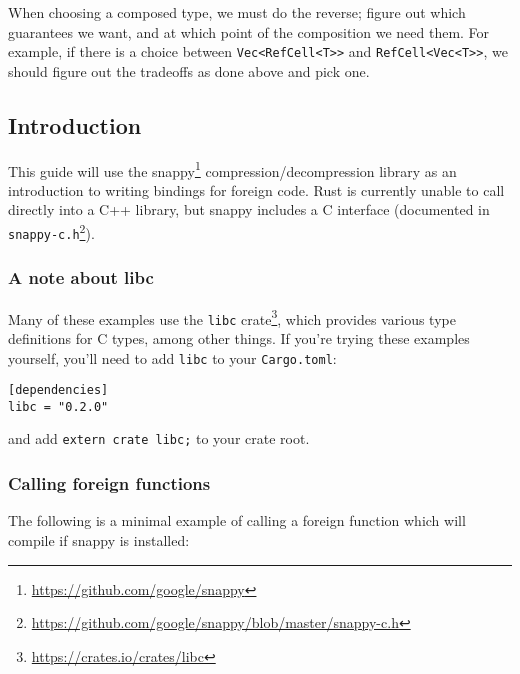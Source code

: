 \documentclass[a4paper,]{book}
\renewcommand{\href}[2]{#2\footnote{\url{#1}}}
\begin{document}
When choosing a composed type, we must do the reverse; figure out which
guarantees we want, and at which point of the composition we need them.
For example, if there is a choice between
\texttt{Vec\textless{}RefCell\textless{}T\textgreater{}\textgreater{}}
and
\texttt{RefCell\textless{}Vec\textless{}T\textgreater{}\textgreater{}},
we should figure out the tradeoffs as done above and pick one.


\subsection{Introduction}\label{introduction-1}

This guide will use the \href{https://github.com/google/snappy}{snappy}
compression/decompression library as an introduction to writing bindings
for foreign code. Rust is currently unable to call directly into a C++
library, but snappy includes a C interface (documented in
\href{https://github.com/google/snappy/blob/master/snappy-c.h}{\texttt{snappy-c.h}}).

\subsubsection{A note about libc}\label{a-note-about-libc}

Many of these examples use \href{https://crates.io/crates/libc}{the
\texttt{libc} crate}, which provides various type definitions for C
types, among other things. If you're trying these examples yourself,
you'll need to add \texttt{libc} to your \texttt{Cargo.toml}:

\begin{verbatim}
[dependencies]
libc = "0.2.0"
\end{verbatim}

and add \texttt{extern\ crate\ libc;} to your crate root.

\subsubsection{Calling foreign
functions}\label{calling-foreign-functions}

The following is a minimal example of calling a foreign function which
will compile if snappy is installed:
\end{document}
